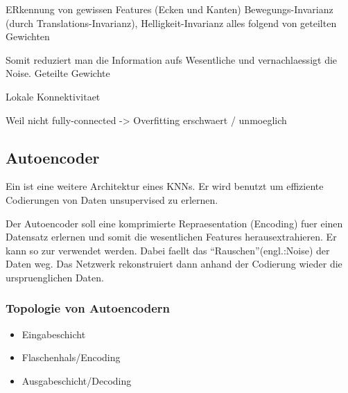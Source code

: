 \documentclass[../main]{subfiles}
\begin{document}
ERkennung von gewissen Features (Ecken und Kanten)
Bewegungs-Invarianz (durch Translations-Invarianz), Helligkeit-Invarianz
alles folgend von geteilten Gewichten

Somit reduziert man die Information aufs Wesentliche und vernachlaessigt die Noise.
Geteilte Gewichte

Lokale Konnektivitaet

Weil nicht fully-connected -> Overfitting erschwaert / unmoeglich


\pagebreak
\subsection{Autoencoder}
Ein  ist eine weitere Architektur eines KNNs. Er wird
benutzt um effiziente Codierungen von Daten unsupervised zu erlernen.

Der Autoencoder soll eine komprimierte Repraesentation (Encoding) fuer einen
Datensatz erlernen und somit die wesentlichen Features herausextrahieren. Er
kann so zur  verwendet werden. Dabei faellt
das ``Rauschen''(engl.:Noise) der Daten weg. Das Netzwerk rekonstruiert dann
anhand der Codierung wieder die urspruenglichen Daten.



\subsubsection{Topologie von Autoencodern}

\begin{itemize}
\item{Eingabeschicht}
\item{Flaschenhals/Encoding}
\item{Ausgabeschicht/Decoding}
\end{itemize}
\end{document}
